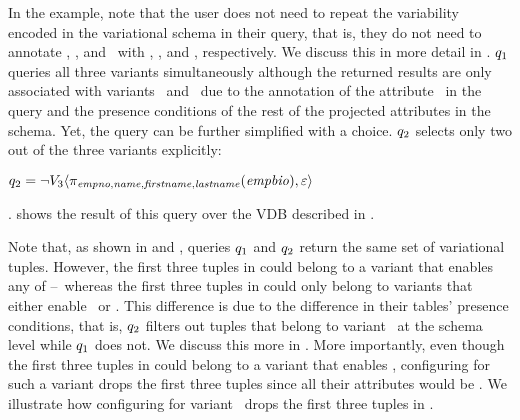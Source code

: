 In the example, note that the user does not need to repeat the variability  encoded
in the variational schema in their query, that is, they do not need to annotate \name,
\fname, and \lname\ with \vFour, \vFive, and \vFive, respectively. We discuss
this in more detail in . $\vQ_1$
queries all three variants simultaneously although the returned results are
only associated with variants \vFour\ and \vFive\ due to the annotation of the
attribute \empno\ in the query and the presence conditions of the rest of the
projected attributes in the schema.
%
Yet, the query can be further simplified with a choice. $\vQ_2$ selects only two
out of the three variants explicitly:\\
\centerline{\ensuremath{
\vQ_2=\chc[\neg \vThree]{\pi_{\empno,\name,\fname,\lname}(\empbio),\empRel}}}. 
%
 shows the result of this query over the VDB described in .
%




Note that, as shown in  and , 
queries $\vQ_1$ and $\vQ_2$ return the same set of variational tuples.
However, the first three tuples in  could belong to a variant that 
enables any of \vThree--\vFive\ whereas the first three tuples in 
could only belong to variants that either enable \vFour\ or \vFive. 
This difference is due to the difference in their tables' presence conditions, 
that is, $\vQ_2$ filters out tuples that belong to variant \vThree\ at the schema 
level while $\vQ_1$ does not. We discuss this more in . 
More importantly, even though the first three tuples in  could 
belong to a variant that enables \vThree, configuring 
for such a variant drops the first three tuples since all their attributes would 
be \nul. We illustrate how configuring  for variant \setDef \vThree\
drops the first three tuples in .
%


